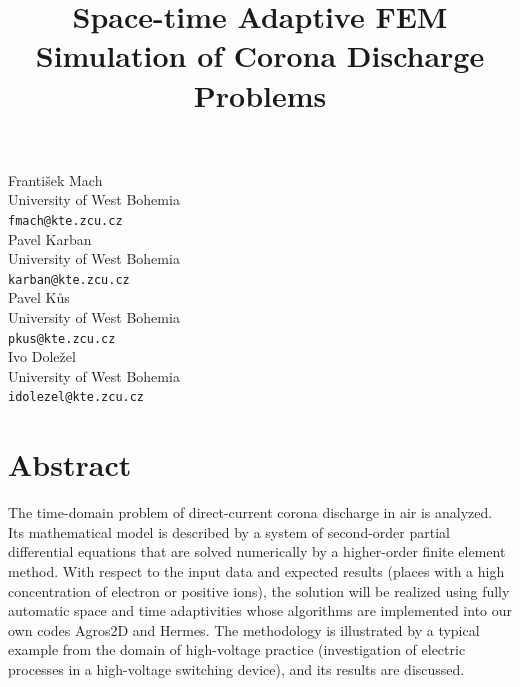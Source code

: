 \documentclass[article,A4,11pt]{llncs}%
\begin{document}
\title{Space-time Adaptive FEM Simulation of Corona Discharge Problems}
 \author{} \institute{}
\maketitle
\begin{center}
{\large Franti\v{s}ek Mach}\\
University of West Bohemia\\
{\tt fmach@kte.zcu.cz}
\\ \vspace{4mm}
{\large Pavel Karban}\\
University of West Bohemia\\
{\tt karban@kte.zcu.cz}
\\ \vspace{4mm}
{\large Pavel K\r{u}s}\\
University of West Bohemia\\
{\tt pkus@kte.zcu.cz}
\\ \vspace{4mm}
{\large Ivo Dole\v{z}el}\\
University of West Bohemia\\
{\tt idolezel@kte.zcu.cz}
\end{center}

\section*{Abstract}
The time-domain problem of direct-current corona discharge in air is analyzed. Its mathematical model is described by a system of second-order partial differential equations that are solved numerically by a higher-order finite element method. With respect to the input data and expected results (places with a high concentration of electron or positive ions), the solution will be realized using fully automatic space and time adaptivities whose algorithms are implemented into our own codes Agros2D and Hermes. The methodology is illustrated by a typical example from the domain of high-voltage practice (investigation of electric processes in a high-voltage switching device), and its results are discussed.
\end{document}
